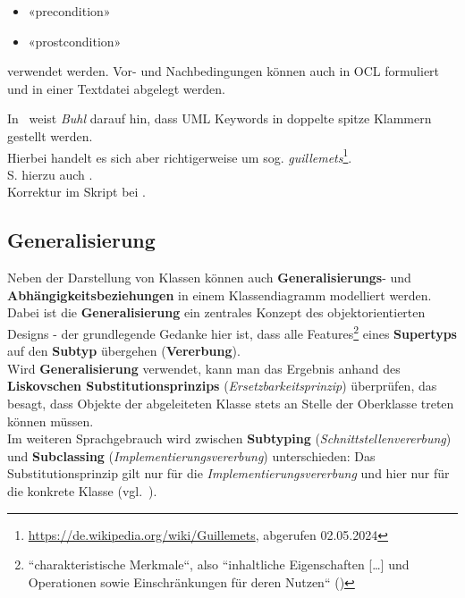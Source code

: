 \begin{itemize}
    \item[] «precondition»
    \item[] «prostcondition»
\end{itemize}

\noindent
verwendet werden.
Vor- und Nachbedingungen können auch in OCL formuliert und in einer Textdatei abgelegt werden.


\begin{tcolorbox}[title=Doppelte Spitze Klammern,colback=red!20]
    In~\cite[25]{Buh09} weist \textit{Buhl} darauf hin, dass UML Keywords in doppelte spitze Klammern gestellt werden.\\
    Hierbei handelt es sich aber richtigerweise um sog. \textit{guillemets}\footnote{
        \url{https://de.wikipedia.org/wiki/Guillemets}, abgerufen 02.05.2024
    }.\\
    S. hierzu auch \cite[745]{OMG17}.\\
    Korrektur im Skript bei \cite[39]{Buh09}.
\end{tcolorbox}

\subsection*{Generalisierung}
Neben der Darstellung von Klassen können auch \textbf{Generalisierungs}- und \textbf{Abhängigkeitsbeziehungen} in einem Klassendiagramm modelliert werden.\\

\noindent
Dabei ist die \textbf{Generalisierung} ein zentrales Konzept des objektorientierten Designs - der grundlegende Gedanke hier ist, dass alle Features\footnote{
``charakteristische Merkmale``, also ``inhaltliche Eigenschaften [\ldots] und Operationen sowie Einschränkungen für deren Nutzen`` (\cite[17]{Buh09})
} eines \textbf{Supertyps} auf den \textbf{Subtyp} übergehen (\textbf{Vererbung}).\\

\noindent
Wird \textbf{Generalisierung} verwendet, kann man das Ergebnis anhand des \textbf{Liskovschen Substitutionsprinzips} (\textit{Ersetzbarkeitsprinzip}) überprüfen, das besagt, dass Objekte der abgeleiteten Klasse stets an Stelle der Oberklasse treten können müssen.\\

\noindent
Im weiteren Sprachgebrauch wird zwischen \textbf{Subtyping} (\textit{Schnittstellenvererbung}) und \textbf{Subclassing} (\textit{Implementierungsvererbung}) unterschieden:
Das Substitutionsprinzip gilt nur für die \textit{Implementierungsvererbung} und hier nur für die konkrete Klasse (vgl.~\cite[26]{Buh09}).\\

